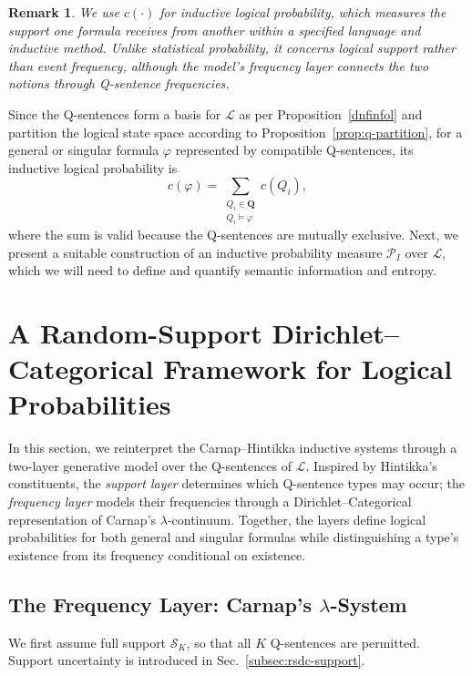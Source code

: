 \documentclass[10pt, conference, letterpaper]{ IEEEtran}
\theoremstyle{bfnote}
\newtheorem{remark}{Remark}
\newcommand{\QSent}{\mathbf{Q}} %
\newcommand{\Language}{\mathcal{L}} %
\newcommand{\ProbMeas}{\mathcal{P}_{I}} %
\begin{document}
\begin{remark}

We use $c(\cdot)$ for inductive logical probability, which measures the support one formula receives from another within a specified language and inductive method. Unlike statistical probability, it concerns logical support rather than event frequency, although the model's frequency layer connects the two notions through Q-sentence frequencies.
\end{remark}

Since the
Q-sentences form a basis for $\Language$ as per Proposition~\ref{dnfinfol} and partition the logical state space
according to Proposition~\ref{prop:q-partition}, for a general or singular formula $\varphi$ represented by
compatible Q-sentences, its inductive logical probability is
\begin{equation}
\label{eq:formula-probability}
c(\varphi)
=
\sum_{\substack{
Q_i\in\QSent\\
Q_i\models\varphi
}}
c(Q_i),
\end{equation}
where the sum is valid because the Q-sentences are mutually exclusive. Next, we present a suitable construction of an inductive probability measure $\ProbMeas$ over $\Language$, which we will need to define and quantify semantic information and entropy.

\section{A Random-Support Dirichlet--Categorical Framework for Logical
Probabilities}
\label{sec:rsdc}

In this section, we reinterpret the Carnap--Hintikka inductive systems through a two-layer
generative model over the Q-sentences of $\Language$. Inspired by
Hintikka's constituents, the \emph{support layer} determines which
Q-sentence types may occur; the \emph{frequency layer} models their
frequencies through a Dirichlet--Categorical representation of Carnap's
$\lambda$-continuum. Together, the layers define logical probabilities for
both general and singular formulas while distinguishing a type's existence
from its frequency conditional on existence.

\subsection{The Frequency Layer: Carnap's $\lambda$-System}
\label{subsec:rsdc-frequency}

We first assume full support $\mathcal{S}_K$, so that all $K$ Q-sentences are permitted.
Support uncertainty is introduced in Sec.~\ref{subsec:rsdc-support}.
\end{document}
